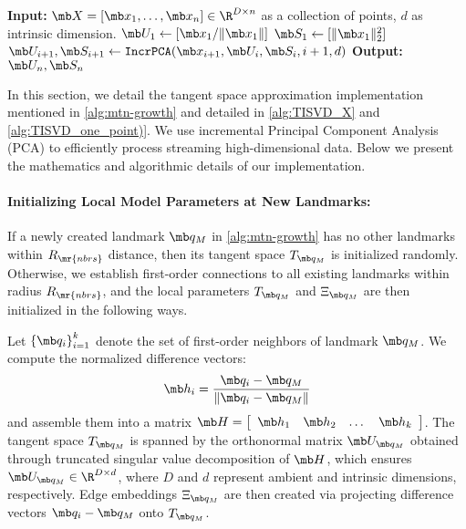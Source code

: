 \begin{algorithm}[tb]
      \caption{$\mathtt{IncrPCAonMatrix}(\mb X, d)$} \label{alg:TISVD_X}
      \begin{algorithmic}[1]
        \STATE \textbf{Input:} $\mb X = [\mb x_1, \dots, \mb x_n] \in \R^{D \times n}$ as a collection of points, $d$ as intrinsic dimension.
        \STATE $\mb U_1 \leftarrow [\mb x_1 / \| \mb x_1 \|]$
        \STATE $\mb S_1 \leftarrow [\|\mb x_1\|^2_2]$
        \STATE $\mb U_{i+1}, \mb S_{i+1} \leftarrow \mathtt{IncrPCA}(\mb x_{i+1}, \mb U_{i}, \mb S_{i}, i+1, d)$
    \ENDFOR
    \STATE \textbf{Output:} $\mb U_n, \mb S_n$
    \end{algorithmic}
\end{algorithm}

In this section, we detail the tangent space approximation implementation mentioned in \cref{alg:mtn-growth} and detailed in \cref{alg:TISVD_X} and \cref{alg:TISVD_one_point)}. We use incremental Principal Component Analysis (PCA) to efficiently process streaming high-dimensional data. Below we present the mathematics and algorithmic details of our implementation.

\paragraph{Initializing Local Model Parameters at New Landmarks:} If a newly created landmark $\mb q_M$ in \cref{alg:mtn-growth} has no other landmarks within $R_\mr{nbrs}$ distance, then its tangent space $T_{\mb q_M}$ is initialized randomly. Otherwise, we establish first-order connections to all existing landmarks within radius $R_\mr{nbrs}$, and the local parameters $T_{\mb q_M}$ and $\Xi_{\mb q_M}$ are then initialized in the following ways.



Let $ \left \{\mb q_i \right \}_{i=1}^k$ denote the set of first-order neighbors of landmark $\mb q_M$. We compute the normalized difference vectors:
\begin{align}
    \mb h_i = \frac{\mb q_i - \mb q_M}{\|\mb q_i - \mb q_M\|}
\end{align}
\noindent and assemble them into a matrix $\mb H = \left[ \begin{array}{cccc} \mb h_1 & \mb h_2 & \dots & \mb h_k \end{array} \right]$. The tangent space $T_{\mb q_M}$ is spanned by the orthonormal matrix $\mb U_{\mb q_M}$ obtained through truncated singular value decomposition of $\mb H$, which ensures $\mb U_{\mb q_M} \in \R^{D \times d}$, where $D$ and $d$ represent ambient and intrinsic dimensions, respectively. Edge embeddings $\Xi_{\mb q_M}$ are then created via projecting difference vectors $\mb q_i - \mb q_M$ onto $T_{\mb q_M}$.

